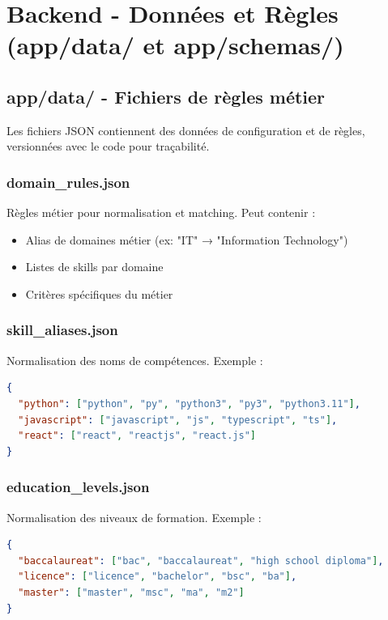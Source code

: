 \documentclass[12pt,a4paper,oneside]{book}
\begin{document}
\newpage


\section{Backend - Données et Règles (app/data/ et app/schemas/)}

\subsection{app/data/ - Fichiers de règles métier}

Les fichiers JSON contiennent des données de configuration et de règles, versionnées avec le code pour traçabilité.

\subsubsection{domain\_rules.json}

Règles métier pour normalisation et matching. Peut contenir :
\begin{itemize}
    \item Alias de domaines métier (ex: "IT" → "Information Technology")
    \item Listes de skills par domaine
    \item Critères spécifiques du métier
\end{itemize}

\subsubsection{skill\_aliases.json}

Normalisation des noms de compétences. Exemple :
\begin{lstlisting}[language=json]
{
  "python": ["python", "py", "python3", "py3", "python3.11"],
  "javascript": ["javascript", "js", "typescript", "ts"],
  "react": ["react", "reactjs", "react.js"]
}
\end{lstlisting}

\subsubsection{education\_levels.json}

Normalisation des niveaux de formation. Exemple :
\begin{lstlisting}[language=json]
{
  "baccalaureat": ["bac", "baccalaureat", "high school diploma"],
  "licence": ["licence", "bachelor", "bsc", "ba"],
  "master": ["master", "msc", "ma", "m2"]
}
\end{lstlisting}
\end{document}
